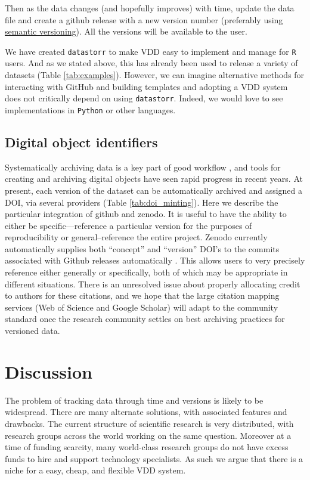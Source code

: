 \documentclass[a4paper,11pt]{article}
\begin{document}
Then as the data changes (and hopefully improves) with time, update the data
file and create a github release with a new version number (preferably
using \href{http://semver.org/}{semantic versioning}). All the versions
will be available to the user. 

We have created \texttt{datastorr} to make VDD easy to implement and manage for \texttt{R} users. And as we stated above, this has already been used to release a variety of datasets (Table \ref{tab:examples}). However, we can imagine alternative methods for interacting with GitHub and building templates and adopting a VDD system does not critically depend on using \texttt{datastorr}. Indeed, we would love to see implementations in \texttt{Python} or other languages.

\subsection{Digital object identifiers}

Systematically archiving data is a key part of good workflow \citep{Wilkinson-2016, Piwowar-2011, Whitlock-2011}, and tools for creating and archiving digital objects have seen rapid progress in recent years.  At present, each version of the dataset can be automatically archived and assigned a DOI, via several providers (Table \ref{tab:doi_minting}).  Here we describe the particular integration of github and zenodo.  It is useful to have the ability to either be specific---reference a particular version for the purposes of reproducibility or general--reference the entire project.  Zenodo currently automatically supplies both ``concept'' and ``version'' DOI's to the commits associated with Github releases automatically \citep[Figure \ref{fig:semantic} and ][]{Nielsen-2017}.  This allows users to very precisely reference either generally or specifically, both of which may be appropriate in different situations.  There is an unresolved issue about properly allocating credit to authors for these citations, and we hope that the large citation mapping services (Web of Science and Google Scholar) will adapt to the community standard once the research community settles on best archiving practices for versioned data.  

\section{Discussion}

The problem of tracking data through time and versions is likely to be widespread. There are many alternate solutions, with associated features and drawbacks.  The current structure of scientific research is very distributed, with research groups across the world working on the same question.  Moreover at a time of funding scarcity, many world-class research groups do not have excess funds to hire and support technology specialists.  As such we argue that there is a niche for a easy, cheap, and flexible VDD system.  
\end{document}
